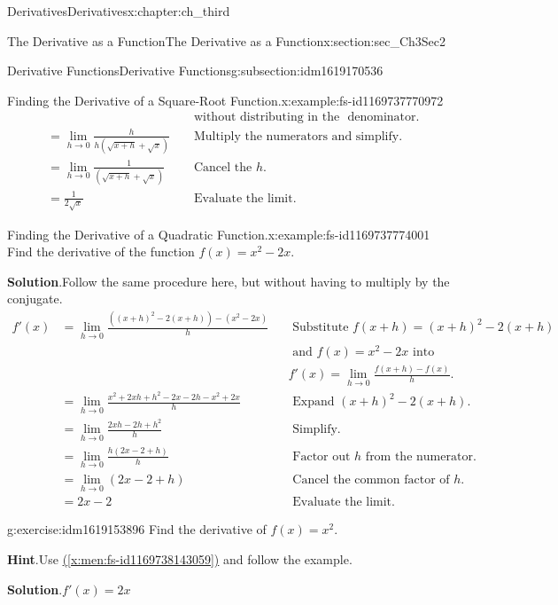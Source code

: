 \documentclass[oneside,10pt,]{book}
\newcommand{\blocktitlefont}{\relax}
\newcommand{\xreffont}{\relax}
\numberwithin{equation}{section}
\newcommand{\amp}{&}
\begin{document}
\begin{chapterptx}{Derivatives}{}{Derivatives}{}{}{x:chapter:ch_third}
\begin{sectionptx}{The Derivative as a Function}{}{The Derivative as a Function}{}{}{x:section:sec_Ch3Sec2}
\begin{subsectionptx}{Derivative Functions}{}{Derivative Functions}{}{}{g:subsection:idm1619170536}
\begin{example}{Finding the Derivative of a Square-Root Function.}{x:example:fs-id1169737770972}
\begin{align*}
\amp \amp \amp \text{ without distributing in the }\text{ denominator. }\\
\amp =\lim_{h\to 0}\frac{h}{h(\sqrt{x+h}+\sqrt{x})}\amp \amp \text{ Multiply the numerators and simplify. }\\
\amp =\lim_{h\to 0}\frac{1}{(\sqrt{x+h}+\sqrt{x})}\amp \amp\text{ Cancel the } h.\\
\amp =\frac{1}{2\sqrt{x}}\amp\amp\text{ Evaluate the limit. }
\end{align*}
\end{example}
\begin{example}{Finding the Derivative of a Quadratic Function.}{x:example:fs-id1169737774001}%
Find the derivative of the function \(f(x)=x^2-2x.\)%
\par\smallskip%
\noindent\textbf{\blocktitlefont Solution}.\hypertarget{g:solution:idm1619154664}{}\quad{}Follow the same procedure here, but without having to multiply by the conjugate.%
%
\begin{align*}
f'(x)\amp=\lim_{h\to 0}\frac{((x+h)^2-2(x+h))-(x^2-2x)}{h}\amp \amp\text{ Substitute } f(x+h)=(x+h)^2-2(x+h) \\
\amp \amp \amp \text{ and }f(x)=x^2-2x \text{ into }\\
\amp \amp \amp f'(x)=\lim_{h\to 0}\frac{f(x+h)-f(x)}{h}.\\
\amp=\lim_{h\to 0}\frac{x^2+2xh+h^2-2x-2h-x^2+2x}{h}\amp \amp\text{ Expand } (x+h)^2-2(x+h).\\
\amp=\lim_{h\to 0}\frac{2xh-2h+h^2}{h}\amp\amp\text{ Simplify. }\\
\amp=\lim_{h\to 0}\frac{h(2x-2+h)}{h}\amp\amp\text{ Factor out } h \text{ from the numerator. }\\
\amp=\lim_{h\to 0}(2x-2+h)\amp\amp\text{ Cancel the common factor of } h.\\
\amp=2x-2\amp\amp\text{ Evaluate the limit. }
\end{align*}
\end{example}
\begin{inlineexercise}{}{g:exercise:idm1619153896}%
Find the derivative of \(f(x)=x^2.\)%
\par\smallskip%
\noindent\textbf{\blocktitlefont Hint}.\hypertarget{g:hint:idm1619147624}{}\quad{}Use \hyperref[x:men:fs-id1169738143059]{({\xreffont\ref{x:men:fs-id1169738143059}})} and follow the example.%
\par\smallskip%
\noindent\textbf{\blocktitlefont Solution}.\hypertarget{g:solution:idm1619148776}{}\quad{}\(f'(x)=2x\)%
\end{inlineexercise}%

\end{subsectionptx}
\end{sectionptx}
\end{chapterptx}
\end{document}
